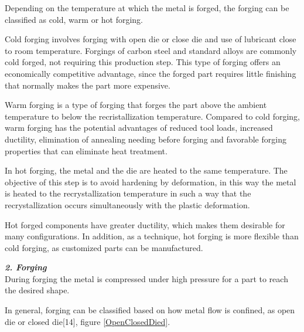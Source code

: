 Depending on the temperature at which the metal is forged, the forging can be classified as cold, warm or hot forging.\par
Cold forging involves forging with open die or close die and use of lubricant close to room temperature. Forgings of carbon steel and standard alloys are commonly cold forged, not requiring this production step. This type of forging offers an economically competitive advantage, since the forged part requires little finishing that normally makes the part more expensive\cite{site5,bryson2005heat}.\par
Warm forging is a type of forging that forges the part above the ambient temperature to below the recristallization temperature. Compared to cold forging, warm forging has the potential advantages of reduced tool loads, increased ductility, elimination of annealing needing before forging and favorable forging properties that can eliminate heat treatment\cite{site5,bryson2005heat}.\par
In hot forging, the metal and the die are heated to the same temperature. The objective of this step is to avoid hardening by deformation, in this way the metal is heated to the recrystallization temperature in such a way that the recrystallization occurs simultaneously with the plastic deformation\cite{site5,bryson2005heat}.\par
Hot forged components have greater ductility, which makes them desirable for many configurations. In addition, as a technique, hot forging is more flexible than cold forging, as customized parts can be manufactured\cite{site5,bryson2005heat}. \par
\vspace{5}


\textbf{\emph{2. Forging}}\\

During forging the metal is compressed under high pressure for a part to reach the desired shape. \par
In general, forging can be classified based on how metal flow is confined, as open die or closed die[14], figure \ref{OpenClosedDied}. \par



